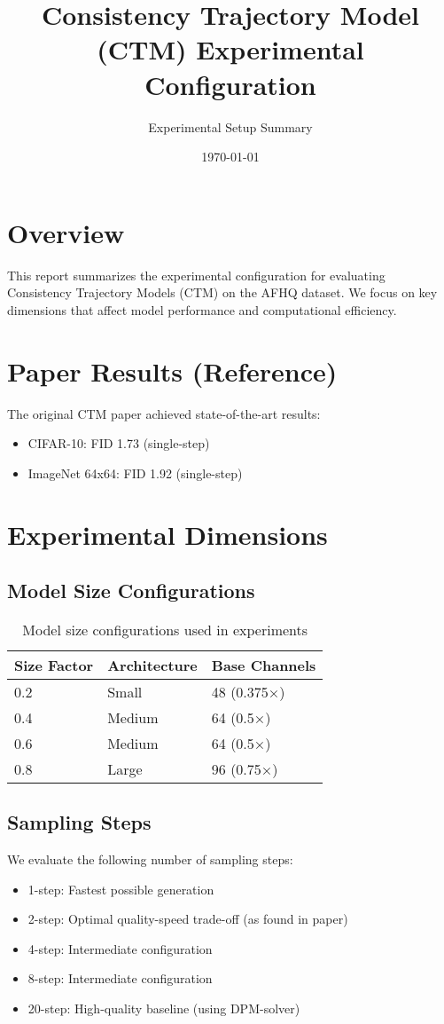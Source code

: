 \documentclass{article}
\title{Consistency Trajectory Model (CTM) Experimental Configuration}
\author{Experimental Setup Summary}
\date{\today}
\begin{document}
\maketitle

\section{Overview}
This report summarizes the experimental configuration for evaluating Consistency Trajectory Models (CTM) on the AFHQ dataset. We focus on key dimensions that affect model performance and computational efficiency.

\section{Paper Results (Reference)}
The original CTM paper achieved state-of-the-art results:
\begin{itemize}
    \item CIFAR-10: FID 1.73 (single-step)
    \item ImageNet 64x64: FID 1.92 (single-step)
\end{itemize}

\section{Experimental Dimensions}

\subsection{Model Size Configurations}
\begin{table}[h]
\centering
\begin{tabular}{@{}lll@{}}
\toprule
Size Factor & Architecture & Base Channels \\
\midrule
0.2 & Small & 48 (0.375×) \\
0.4 & Medium & 64 (0.5×) \\
0.6 & Medium & 64 (0.5×) \\
0.8 & Large & 96 (0.75×) \\
\bottomrule
\end{tabular}
\caption{Model size configurations used in experiments}
\end{table}

\subsection{Sampling Steps}
We evaluate the following number of sampling steps:
\begin{itemize}
    \item 1-step: Fastest possible generation
    \item 2-step: Optimal quality-speed trade-off (as found in paper)
    \item 4-step: Intermediate configuration
    \item 8-step: Intermediate configuration
    \item 20-step: High-quality baseline (using DPM-solver)
\end{itemize}
\end{document}
